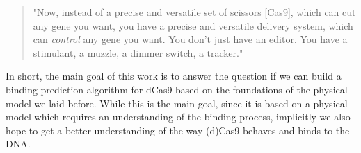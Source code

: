 \begin{quote}
"Now, instead of a precise and versatile set of scissors [Cas9], which can cut any gene you want, you have a precise and versatile delivery system, which can \emph{control} any gene you want. You don't just have an editor. You have a stimulant, a muzzle, a dimmer switch, a tracker."
\end{quote}

In short, the main goal of this work is to answer the question if we can build a binding prediction algorithm  for dCas9 based on the foundations of the physical model we laid before. While this is the main goal, since it is based on a physical model which requires an understanding of the binding process, implicitly we also hope to get a better understanding of the way (d)Cas9 behaves and binds to the DNA.

